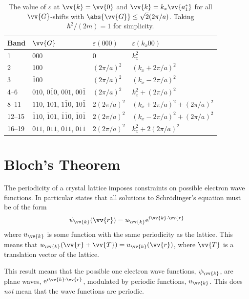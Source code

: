\documentclass[fleqn]{NotesClass}
\newcommand*{\e}{\mathrm{e}}
\begin{document}
    \begin{table}
        \caption{The value of \(\varepsilon\) at \(\vv{k} = \vv{0}\) and \(\vv{k} = k_x\vv{a_1^*}\) for all \(\vv{G}\)-shifts with \(\abs{\vv{G}} \le \sqrt{2}(2\pi/a)\). Taking \(\hbar^2/(2m) = 1\) for simplicity.}
        \label{tab:G-shifted paraboloids}
        \begin{tabular}{llll}\toprule
            Band & \(\vv{G}\) & \(\varepsilon(000)\) & \(\varepsilon(k_x00)\)\\\midrule
            1 & 000 & 0 & \(k_x^2\)\\
            2 & 100 & \((2\pi/a)^2\) & \((k_x + 2\pi/a)^2\)\\
            3 & \(\bar{1}00\) & \((2\pi/a)^2\) & \((k_x - 2\pi/a)^2\)\\
            4--6 & \(010\), \(0\bar{1}0\), \(001\), \(00\bar{1}\) & \((2\pi/a)^2\) & \(k_x^2 + (2\pi/a)^2\)\\
            8--11 & \(110\), \(101\), \(1\bar{1}0\), \(10\bar{1}\) & \(2(2\pi/a)^2\) & \((k_x + 2\pi/a)^2 + (2\pi/a)^2\)\\
            12--15 & \(\bar{1}10\), \(\bar{1}01\), \(\bar{1}\bar{1}0\), \(\bar{1}0\bar{1}\) & \(2(2\pi/a)^2\) & \((k_x - 2\pi/a)^2 + (2\pi/a)^2\)\\
            16--19 & \(011\), \(01\bar{1}\), \(0\bar{1}1\), \(0\bar{1}\bar{1}\) & \(2(2\pi/a)^2\) & \(k_x^2 + 2(2\pi/a)^2\)\\\bottomrule
        \end{tabular}
    \end{table}
    
    \section{Bloch's Theorem}
    The periodicity of a crystal lattice imposes constraints on possible electron wave functions.
    In particular  states that all solutions to Schr\"odinger's equation must be of the form
    \begin{equation}
        \psi_{\vv{k}}(\vv{r}) = u_{\vv{k}}\e^{i\vv{k}\cdot\vv{r}}
    \end{equation}
    where \(u_{\vv{k}}\) is some function with the same periodicity as the lattice.
    This means that \(u_{\vv{k}}(\vv{r} + \vv{T}) = u_{\vv{k}}(\vv{r})\), where \(\vv{T}\) is a translation vector of the lattice.
    
    This result means that the possible one electron wave functions, \(\psi_{\vv{k}}\), are plane waves, \(\e^{i\vv{k}\cdot\vv{r}}\), modulated by periodic functions, \(u_{\vv{k}}\).
    This does \emph{not} mean that the wave functions are periodic.
    
\end{document}
